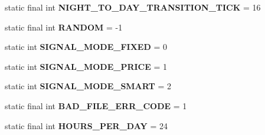 \begin{DoxyCompactItemize}
\item 
\hypertarget{classuk_1_1ac_1_1dmu_1_1iesd_1_1cascade_1_1base_1_1_consts_add95fd9b3416fd26bcd888c1eb6d219e}{static final int {\bfseries N\-I\-G\-H\-T\-\_\-\-T\-O\-\_\-\-D\-A\-Y\-\_\-\-T\-R\-A\-N\-S\-I\-T\-I\-O\-N\-\_\-\-T\-I\-C\-K} = 16}\label{classuk_1_1ac_1_1dmu_1_1iesd_1_1cascade_1_1base_1_1_consts_add95fd9b3416fd26bcd888c1eb6d219e}

\item 
\hypertarget{classuk_1_1ac_1_1dmu_1_1iesd_1_1cascade_1_1base_1_1_consts_a85847443260cfef99d26924ba181e698}{static final int {\bfseries R\-A\-N\-D\-O\-M} = -\/1}\label{classuk_1_1ac_1_1dmu_1_1iesd_1_1cascade_1_1base_1_1_consts_a85847443260cfef99d26924ba181e698}

\item 
\hypertarget{classuk_1_1ac_1_1dmu_1_1iesd_1_1cascade_1_1base_1_1_consts_a6a3383a281c7cccffd482df57c691547}{static int {\bfseries S\-I\-G\-N\-A\-L\-\_\-\-M\-O\-D\-E\-\_\-\-F\-I\-X\-E\-D} = 0}\label{classuk_1_1ac_1_1dmu_1_1iesd_1_1cascade_1_1base_1_1_consts_a6a3383a281c7cccffd482df57c691547}

\item 
\hypertarget{classuk_1_1ac_1_1dmu_1_1iesd_1_1cascade_1_1base_1_1_consts_a7d6a0ef69866b01388b07ee204e5a5be}{static int {\bfseries S\-I\-G\-N\-A\-L\-\_\-\-M\-O\-D\-E\-\_\-\-P\-R\-I\-C\-E} = 1}\label{classuk_1_1ac_1_1dmu_1_1iesd_1_1cascade_1_1base_1_1_consts_a7d6a0ef69866b01388b07ee204e5a5be}

\item 
\hypertarget{classuk_1_1ac_1_1dmu_1_1iesd_1_1cascade_1_1base_1_1_consts_a7886494ff4bcf10bbe9110546de63e37}{static int {\bfseries S\-I\-G\-N\-A\-L\-\_\-\-M\-O\-D\-E\-\_\-\-S\-M\-A\-R\-T} = 2}\label{classuk_1_1ac_1_1dmu_1_1iesd_1_1cascade_1_1base_1_1_consts_a7886494ff4bcf10bbe9110546de63e37}

\item 
\hypertarget{classuk_1_1ac_1_1dmu_1_1iesd_1_1cascade_1_1base_1_1_consts_a3474b5ff3d45ee26b9096c0275acd80f}{static final int {\bfseries B\-A\-D\-\_\-\-F\-I\-L\-E\-\_\-\-E\-R\-R\-\_\-\-C\-O\-D\-E} = 1}\label{classuk_1_1ac_1_1dmu_1_1iesd_1_1cascade_1_1base_1_1_consts_a3474b5ff3d45ee26b9096c0275acd80f}

\item 
\hypertarget{classuk_1_1ac_1_1dmu_1_1iesd_1_1cascade_1_1base_1_1_consts_a983e64649a30b6b120bb5e74e526cc4d}{static final int {\bfseries H\-O\-U\-R\-S\-\_\-\-P\-E\-R\-\_\-\-D\-A\-Y} = 24}\label{classuk_1_1ac_1_1dmu_1_1iesd_1_1cascade_1_1base_1_1_consts_a983e64649a30b6b120bb5e74e526cc4d}


\end{DoxyCompactItemize}
